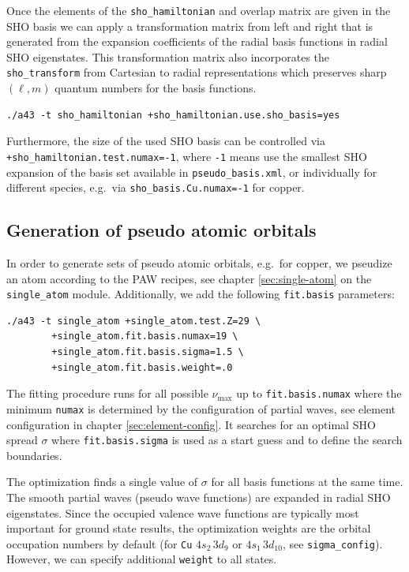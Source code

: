 \documentclass[oribibl]{llncs}
\newcommand{\um}[1]{_{\mathrm{#1}}}
\newcommand{\ttt}[1]{\texttt{#1}}
\begin{document}
Once the elements of the \ttt{sho\_hamiltonian} and overlap matrix are given in the \ac{SHO} basis
we can apply a transformation matrix from left and right that is generated from the expansion
coefficients of the radial basis functions in radial \ac{SHO} eigenstates.
This transformation matrix also incorporates the \ttt{sho\_transform} from Cartesian to radial
representations which preserves sharp $(\ell,m)$ quantum numbers for the basis functions.

\begin{verbatim}
./a43 -t sho_hamiltonian +sho_hamiltonian.use.sho_basis=yes
\end{verbatim}

\noindent
Furthermore, the size of the used \ac{SHO} basis can be controlled via \ttt{+sho\_hamiltonian.test.numax=-1},
where \ttt{-1} means use the smallest \ac{SHO} expansion of the basis set available in \ttt{pseudo\_basis.xml}, or
individually for different species, e.g.~via \ttt{sho\_basis.Cu.numax=-1} for copper.

\subsection{Generation of pseudo atomic orbitals}
In order to generate sets of pseudo atomic orbitals, e.g.~for copper, we pseudize an atom according to the \ac{PAW} recipes, see chapter \ref{sec:single-atom} on the \ttt{single\_atom} module.
Additionally, we add the following \ttt{fit.basis} parameters:
\begin{verbatim}
./a43 -t single_atom +single_atom.test.Z=29 \
        +single_atom.fit.basis.numax=19 \
        +single_atom.fit.basis.sigma=1.5 \
        +single_atom.fit.basis.weight=.0 
\end{verbatim}
The fitting procedure runs for all possible $\nu\um{max}$ up to \ttt{fit.basis.numax}
where the minimum \ttt{numax} is determined by the configuration of partial waves, see element configuration in chapter \ref{sec:element-config}. 
It searches for an optimal \ac{SHO} spread $\sigma$ where \ttt{fit.basis.sigma} is used as a start guess and to define the search boundaries.

The optimization finds a single value of $\sigma$ for all basis functions at the same time.
The smooth partial waves (pseudo wave functions) are expanded in radial \ac{SHO} eigenstates.
Since the occupied valence wave functions are typically most important for ground state results,
the optimization weights are the orbital occupation numbers by default 
(for \ttt{Cu} $4s_{2} \, 3d_{9}$ or $4s_{1} \, 3d_{10}$, see \ttt{sigma\_config}).
However, we can specify additional \ttt{weight} to all states.
\end{document}
